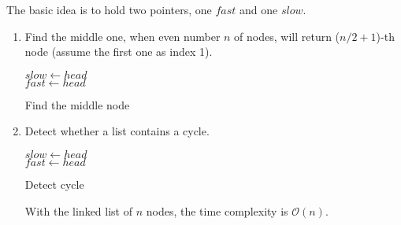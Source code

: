 \documentclass{assignment}
\begin{document}
	    
	        \begin{homeworkProblem}
The basic idea is to hold two pointers, one $fast$ and one $slow$. 
\begin{enumerate}
\item    Find the middle one, when even number $n$ of nodes, will return ($n/2+1$)-th node (assume the first one as index 1).


\begin{algorithm}[H]
 \BlankLine
$slow \leftarrow head$ \\
$fast \leftarrow head$ \\
\caption{Find the middle node} \end{algorithm}
\item Detect whether a list contains a cycle.


\begin{algorithm}[H]
 \BlankLine
$slow \leftarrow head$ \\
$fast \leftarrow head$ \\
\caption{Detect cycle} \end{algorithm}
With the linked list of $n$ nodes, the time complexity is $\mathcal{O}(n)$.

\end{enumerate}
	      
	      
	        \end{homeworkProblem}
	        
\end{document}

